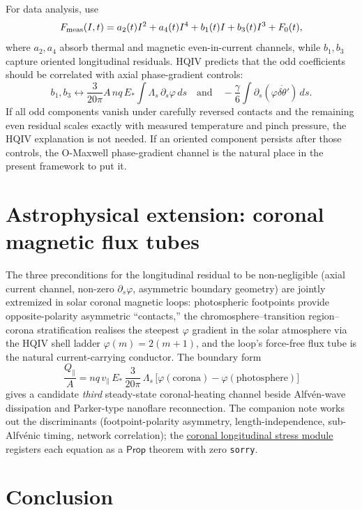 \documentclass[11pt]{amsart}
\begin{document}
For data analysis, use
\[
F_{\rm meas}(I,t)
  =
  a_2(t)I^2
  +a_4(t)I^4
  +b_1(t)I
  +b_3(t)I^3
  +F_0(t),
\]
where $a_2,a_4$ absorb thermal and magnetic even-in-current channels, while $b_1,b_3$ capture oriented longitudinal residuals. HQIV predicts that the odd coefficients should be correlated with axial phase-gradient controls:
\[
b_1,b_3
  \longleftrightarrow
  \frac{3}{20\pi}A\,nq\,E_\ast
  \int \Lambda_s\,\partial_s\varphi\,ds
  \quad
  \text{and}
  \quad
  -\frac{\gamma}{6}\int \partial_s(\varphi\dot{\delta\theta'})\,ds .
\]
If all odd components vanish under carefully reversed contacts and the remaining even residual scales exactly with measured temperature and pinch pressure, the HQIV explanation is not needed. If an oriented component persists after those controls, the O-Maxwell phase-gradient channel is the natural place in the present framework to put it.

\section{Astrophysical extension: coronal magnetic flux tubes}

The three preconditions for the longitudinal residual to be non-negligible (axial current channel, non-zero $\partial_s\varphi$, asymmetric boundary geometry) are jointly extremized in solar coronal magnetic loops: photospheric footpoints provide opposite-polarity asymmetric ``contacts,'' the chromosphere--transition region--corona stratification realises the steepest $\varphi$ gradient in the solar atmosphere via the HQIV shell ladder $\varphi(m)=2(m+1)$, and the loop's force-free flux tube is the natural current-carrying conductor. The boundary form
\[
\frac{Q_\parallel}{A}
  =
  nq\,v_\parallel\,E_\ast\,\frac{3}{20\pi}\,\Lambda_s\,\bigl[\varphi(\mathrm{corona})-\varphi(\mathrm{photosphere})\bigr]
\]
gives a candidate \emph{third} steady-state coronal-heating channel beside Alfvén-wave dissipation and Parker-type nanoflare reconnection. The companion note
\cite{hqiv-coronal-paper} works out the discriminants (footpoint-polarity asymmetry, length-independence, sub-Alfvénic timing, network correlation); the
\hyperref[lean:coronal-longitudinal]{coronal longitudinal stress module} registers each equation as a $\mathsf{Prop}$ theorem with zero \texttt{sorry}.

\section{Conclusion}
\end{document}
